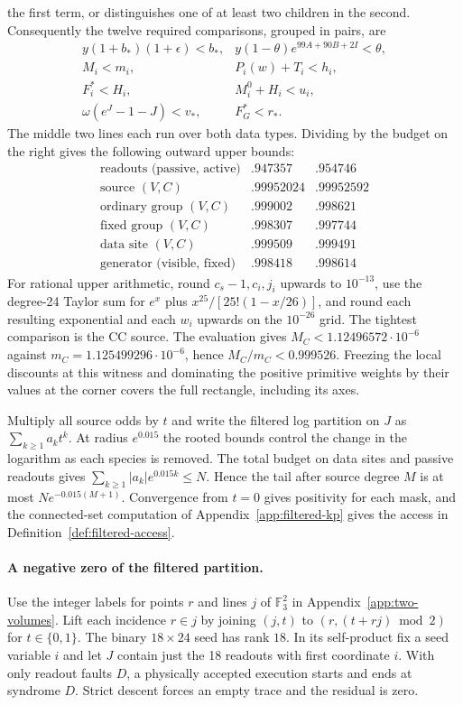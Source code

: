 \documentclass[10pt,twocolumn]{article}
\theoremstyle{definition}
\begin{document}
the first term, or distinguishes one of at least two children
in the second. Consequently the twelve required comparisons, grouped
in pairs, are
\[
\begin{array}{ll}
 y(1+b_*)(1+\epsilon)< b_*,&
 y(1-\theta)e^{99A+90B+2I}<\theta,\\
 M_i<m_i,& P_i(w)+T_i<h_i,\\
 F_i^*<H_i,& M_i^0+H_i<u_i,\\
 \omega(e^J-1-J)<v_*,&F_G^*<r_* .
\end{array}
\]
The middle two lines each run over both data types. Dividing by
the budget on the right gives the following outward upper bounds:
\[
\begin{array}{l|rr}
 \text{readouts (passive, active)}&.947357&.954746\\
 \text{source }(V,C)&.99952024&.99952592\\
 \text{ordinary group }(V,C)&.999002&.998621\\
 \text{fixed group }(V,C)&.998307&.997744\\
 \text{data site }(V,C)&.999509&.999491\\
 \text{generator (visible, fixed)}&.998418&.998614
\end{array}
\]
For rational upper arithmetic, round $c_s-1,c_i,j_i$ upwards to
$10^{-13}$, use the degree-24 Taylor sum for $e^x$ plus
$x^{25}/[25!(1-x/26)]$, and round each resulting exponential and
each $w_i$ upwards on the $10^{-26}$ grid. The tightest comparison
is the CC source. The evaluation gives $M_C<1.12496572\cdot10^{-6}$
against $m_C=1.125499296\cdot10^{-6}$, hence $M_C/m_C<0.999526$.
Freezing the local discounts at this witness and
dominating the positive primitive weights by their values at the
corner covers the full rectangle, including its axes.

Multiply all source odds by $t$ and write the filtered log partition on
$J$ as $\sum_{k\ge1}a_k t^k$. At radius $e^{0.015}$ the rooted bounds
control the change in the logarithm as each species is removed. The
total budget on data sites and passive readouts gives
$\sum_{k\ge1}|a_k|e^{0.015k}\le N$. Hence the tail after source degree
$M$ is at most $Ne^{-0.015(M+1)}$. Convergence from $t=0$ gives
positivity for each mask, and the connected-set computation of
Appendix~\ref{app:filtered-kp} gives the access in
Definition~\ref{def:filtered-access}.

\paragraph{A negative zero of the filtered partition.}
Use the integer labels for points $r$ and lines $j$ of $\mathbb F_3^2$
in Appendix~\ref{app:two-volumes}. Lift each incidence $r\in j$ by
joining $(j,t)$ to $(r,(t+rj)\bmod 2)$ for $t\in\{0,1\}$. The binary
$18\times24$ seed has rank $18$. In its self-product fix a seed
variable $i$ and let $J$ contain just the 18 readouts with first
coordinate $i$. With only readout faults $D$, a physically accepted
execution starts and ends at syndrome $D$. Strict descent forces an
empty trace and the residual is zero.
\end{document}
